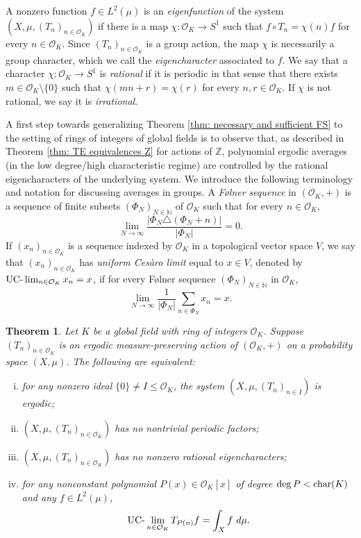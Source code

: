 \documentclass{amsart}
\newtheorem{theorem}{Theorem}[section]
\theoremstyle{definition}
\numberwithin{equation}{section}
\newcommand{\N}{\mathbb{N}}
\newcommand{\Z}{\mathbb{Z}}
\newcommand{\mO}{\mathcal{O}}
\newcommand{\UClim}{\textup{UC-}\lim}
\begin{document}
A nonzero function $f \in L^2(\mu)$ is an \emph{eigenfunction} of the system $(X, \mu, (T_n)_{n \in \mO_K})$ if there is a map $\chi : \mO_K \to S^1$ such that $f \circ T_n = \chi(n)f$ for every $n \in \mO_K$.
Since $(T_n)_{n \in \mO_K}$ is a group action, the map $\chi$ is necessarily a group character, which we call the \emph{eigencharacter} associated to $f$. 
We say that a character $\chi : \mO_K \to S^1$ is \emph{rational} if it is periodic in that sense that there exists $m \in \mO_K \setminus \{0\}$ such that $\chi(mn+r) = \chi(r)$ for every $n, r \in \mO_K$.
If $\chi$ is not rational, we say it is \emph{irrational}.

A first step towards generalizing Theorem \ref{thm: necessary and sufficient FS} to the setting of rings of integers of global fields is to observe that, as described in Theorem \ref{thm: TE equivalences Z} for actions of $\Z$, polynomial ergodic averages (in the low degree/high characteristic regime) are controlled by the rational eigencharacters of the underlying system.
We introduce the following terminology and notation for discussing averages in groups.
A \emph{F{\o}lner sequence} in $(\mO_K,+)$ is a sequence of finite subsets $(\Phi_N)_{N \in \N}$ of $\mO_K$ such that for every $n \in \mO_K$,
\begin{equation*}
    \lim_{N \to \infty} \frac{|\Phi_N \triangle (\Phi_N + n)|}{|\Phi_N|} = 0.
\end{equation*}
If $(x_n)_{n \in \mO_K}$ is a sequence indexed by $\mO_K$ in a topological vector space $V$, we say that $(x_n)_{n \in \mO_K}$ has \emph{uniform Ces\`{a}ro limit} equal to $x \in V$, denoted by $\UClim_{n \in \mO_K} x_n = x$, if for every F{\o}lner sequence $(\Phi_N)_{N \in \N}$ in $\mO_K$,
\begin{equation*}
    \lim_{N \to \infty} \frac{1}{|\Phi_N|} \sum_{n \in \Phi_N} x_n = x.
\end{equation*}

\begin{theorem} \label{thm: TE}
    Let $K$ be a global field with ring of integers $\mO_K$.
	Suppose $(T_n)_{n \in \mO_K}$ is an ergodic measure-preserving action of $(\mO_K, +)$ on a probability space $(X, \mu)$.
	The following are equivalent:
	\begin{enumerate}[(i)]
		\item	for any nonzero ideal $\{0\} \ne I \le \mO_K$, the system $\left( X, \mu, (T_n)_{n \in I} \right)$ is ergodic;
		\item	$\left( X, \mu, (T_n)_{n \in \mO_K} \right)$ has no nontrivial periodic factors;
		\item	$\left( X, \mu, (T_n)_{n \in \mO_K} \right)$ has no nonzero rational eigencharacters;
		\item	for any nonconstant polynomial $P(x) \in \mO_K[x]$ of degree $\deg{P} < \textup{char}(K)$ and any $f \in L^2(\mu)$,
			\begin{equation} \label{eq:polynomial avg proj}
				\UClim_{n \in \mO_K} T_{P(n)} f = \int_X f~d\mu.
			\end{equation}
	\end{enumerate}
\end{theorem}
\end{document}
